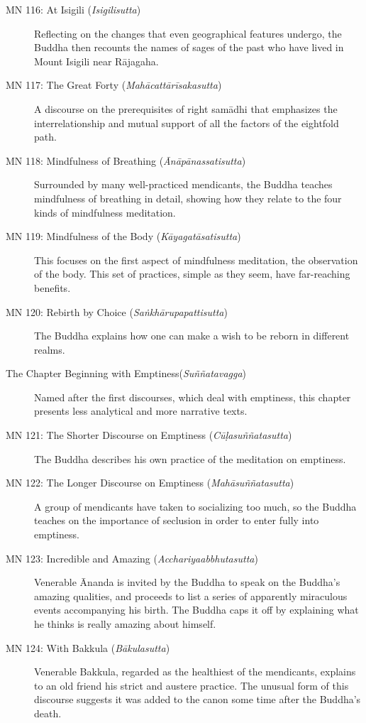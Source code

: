 \documentclass[12pt,openany]{book}%
\begin{document}
\begin{description}
\item[MN 116: At Isigili (\textit{\textsanskrit{Isigilisutta}})] Reflecting on the changes that even geographical features undergo, the Buddha then recounts the names of sages of the past who have lived in Mount Isigili near \textsanskrit{Rājagaha}.%
\item[MN 117: The Great Forty (\textit{\textsanskrit{Mahācattārīsakasutta}})] A discourse on the prerequisites of right \textsanskrit{samādhi} that emphasizes the interrelationship and mutual support of all the factors of the eightfold path.%
\item[MN 118: Mindfulness of Breathing (\textit{\textsanskrit{Ānāpānassatisutta}})] Surrounded by many well-practiced mendicants, the Buddha teaches mindfulness of breathing in detail, showing how they relate to the four kinds of mindfulness meditation.%
\item[MN 119: Mindfulness of the Body (\textit{\textsanskrit{Kāyagatāsatisutta}})] This focuses on the first aspect of mindfulness meditation, the observation of the body. This set of practices, simple as they seem, have far-reaching benefits.%
\item[MN 120: Rebirth by Choice (\textit{\textsanskrit{Saṅkhārupapattisutta}})] The Buddha explains how one can make a wish to be reborn in different realms.%
\item[The Chapter Beginning with Emptiness(\textit{\textsanskrit{Suññatavagga}})] Named after the first discourses, which deal with emptiness, this chapter presents less analytical and more narrative texts.%
\item[MN 121: The Shorter Discourse on Emptiness (\textit{\textsanskrit{Cūḷasuññatasutta}})] The Buddha describes his own practice of the meditation on emptiness.%
\item[MN 122: The Longer Discourse on Emptiness (\textit{\textsanskrit{Mahāsuññatasutta}})] A group of mendicants have taken to socializing too much, so the Buddha teaches on the importance of seclusion in order to enter fully into emptiness.%
\item[MN 123: Incredible and Amazing (\textit{\textsanskrit{Acchariyaabbhutasutta}})] Venerable Ānanda is invited by the Buddha to speak on the Buddha’s amazing qualities, and proceeds to list a series of apparently miraculous events accompanying his birth. The Buddha caps it off by explaining what he thinks is really amazing about himself.%
\item[MN 124: With Bakkula (\textit{\textsanskrit{Bākulasutta}})] Venerable Bakkula, regarded as the healthiest of the mendicants, explains to an old friend his strict and austere practice. The unusual form of this discourse suggests it was added to the canon some time after the Buddha’s death.%

\end{description}
\end{document}
